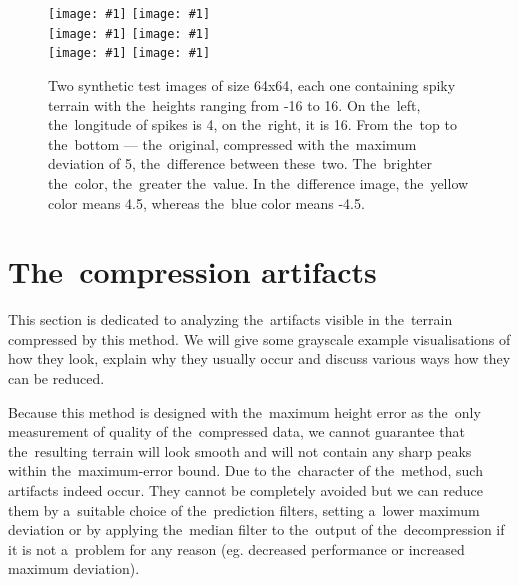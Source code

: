\newcommand{\incexamplpair}[1]{\texttt{[image: \#1]}}

\begin{figure}
	\begin{center}
	\incexamplpair{figures/dim_64_amp_16_lon_4_horizontal_orig.png} 
	\incexamplpair{figures/dim_64_amp_16_lon_16_horizontal_orig.png} \\ 
	\incexamplpair{figures/dim_64_amp_16_lon_4_horizontal_out.png} 
	\incexamplpair{figures/dim_64_amp_16_lon_16_horizontal_out.png} \\ 
	\incexamplpair{figures/dim_64_amp_16_lon_4_horizontal_diff.png} 
	\incexamplpair{figures/dim_64_amp_16_lon_16_horizontal_diff.png}
    \end{center}
	\caption{Two synthetic test images of size 64x64, each one containing spiky terrain with the~heights ranging from -16 to 16. On the~left, the~longitude of spikes is 4, on the~right, it is 16. From the~top to the~bottom --- the~original, compressed with the~maximum deviation of 5, the~difference between these~two. The~brighter the~color, the~greater the~value. In the~difference image, the~yellow color means 4.5, whereas the~blue color means -4.5.}
	\label{fig:result_wave_samples}
\end{figure}

\section{The~compression artifacts}\label{sec:artifs}

This section is dedicated to analyzing the~artifacts visible in the~terrain compressed by this method. We will give some grayscale example visualisations of how they look, explain why they usually occur and discuss various ways how they can be reduced.

Because this method is designed with the~maximum height error as the~only measurement of quality of the~compressed data, we cannot guarantee that the~resulting terrain will look smooth and will not contain any sharp peaks within the~maximum-error bound. Due to the~character of the~method, such artifacts indeed occur. They cannot be completely avoided but we can reduce them by a~suitable choice of the~prediction filters, setting a~lower maximum deviation or by applying the~median filter to the~output of the~decompression if it is not a~problem for any reason (eg. decreased performance or increased maximum deviation).

